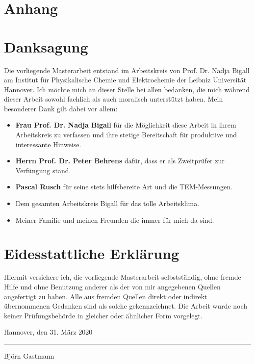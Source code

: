 \documentclass[a4paper,
11pt,
BCOR=7mm,
onecolumn,
headsepline,
captions=tableheading,
parskip=half,
ngerman,
bibtotocnumbered,
listof=totoc]{scrartcl}
\begin{document}
%

%
\tableofcontents
\pagebreak


\pagebreak

\pagebreak

\pagebreak

\pagebreak

\pagebreak

\pagebreak
\printbibliography
\pagebreak
\section{Anhang}
\listoffigures
\pagebreak
\listoftables
\pagebreak
\pagestyle{plain}
\section*{Danksagung}

Die vorliegende Masterarbeit entstand im Arbeitskreis von Prof. Dr. Nadja Bigall am Institut für Physikalische Chemie und Elektrochemie der Leibniz Universität Hannover. Ich möchte mich an dieser Stelle bei allen bedanken, die mich während dieser Arbeit sowohl fachlich als auch moralisch unterstützt haben. Mein besonderer Dank gilt
dabei vor allem:

\begin{itemize}
	\item \textbf{Frau Prof. Dr. Nadja Bigall} für die Möglichkeit diese Arbeit in ihrem Arbeitskreis zu verfassen und ihre stetige Bereitschaft für produktive und interessante Hinweise.
	\item \textbf{Herrn Prof. Dr. Peter Behrens} dafür, dass er als Zweitprüfer zur Verfüngung stand.
	\item \textbf{Pascal Rusch} für seine stets hilfsbereite Art und die TEM-Messungen.
	\item Dem gesamten Arbeitskreis Bigall für das tolle Arbeitsklima.
	\item Meiner Familie und meinen Freunden die immer für mich da sind.
	
\end{itemize}

\pagebreak

\section*{Eidesstattliche Erklärung}

Hiermit versichere ich, die vorliegende Masterarbeit selbstständig, ohne
fremde Hilfe und ohne Benutzung anderer als der von mir angegebenen Quellen
angefertigt zu haben. Alle aus fremden Quellen direkt oder indirekt übernommenen
Gedanken sind als solche gekennzeichnet. Die Arbeit wurde noch
keiner Prüfungsbehörde in gleicher oder ähnlicher Form vorgelegt.

\vspace{5cm}

\noindent Hannover, den 31. März 2020
\vspace{2cm}
\hrule
\vspace{5mm}
\noindent Björn Gastmann
\end{document}
